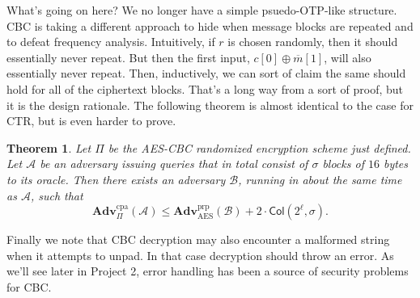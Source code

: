\documentclass[11pt]{article}
\newtheorem{theorem}{Theorem}
\newcommand{\calA}{\mathcal{A}}
\newcommand{\calB}{\mathcal{B}}
\newcommand{\Adv}{\mathbf{Adv}}
\newcommand{\AdvPRP}[2]{\Adv^{\mathrm{prp}}_{#1}({#2})}
\newcommand{\AdvCPA}[2]{\Adv^{\mathrm{cpa}}_{#1}({#2})}
\newcommand{\barm}{\overline{m}}
\newcommand{\aes}{\mathrm{AES}}
\newcommand{\Col}{\mathsf{Col}}
\begin{document}
What's going on here? We no longer have a simple psuedo-OTP-like structure.
CBC is taking a different approach to hide when message blocks are repeated and
to defeat frequency analysis. Intuitively, if $r$ is chosen randomly, then it
should essentially never repeat. But then the first input,
$c[0]\oplus\barm[1]$, will also essentially never repeat. Then, inductively, we
can sort of claim the same should hold for all of the ciphertext blocks. That's
a long way from a sort of proof, but it is the design rationale. The following
theorem is almost identical to the case for CTR, but is even harder to
prove.
\begin{theorem}
    Let $\Pi$ be the AES-CBC randomized encryption scheme just defined.  Let
    $\calA$ be an adversary issuing queries that in total consist of $\sigma$
    blocks of $16$ bytes to its oracle. Then there exists an adversary $\calB$,
    running in about the same time as $\calA$, such that
    \[
        \AdvCPA{\Pi}{\calA} \leq \AdvPRP{\aes}{\calB} + 2\cdot \Col(2^\ell,\sigma).
    \]
\end{theorem}


Finally we note that CBC decryption may also encounter a malformed string when
it attempts to unpad. In that case decryption should throw an error. As we'll
see later in Project 2, error handling has been a source of security problems
for CBC.
\end{document}
